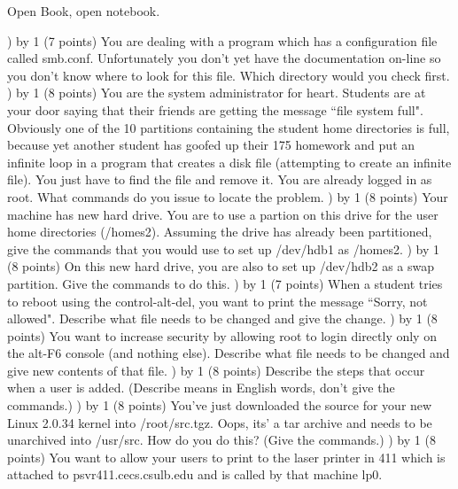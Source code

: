 
\parindent=0in
\nopagenumbers
\newcount\quesno
{}
\def\ques{\number\quesno) \advance\quesno by 1}
\def\aspace{\vskip 1.5in}

Open Book, open notebook.

\ques
(7 points)
You are dealing with a program which has a configuration file
called {\ltt{}smb.conf}.
Unfortunately you don't yet have the documentation on-line so you
don't know where to look for this file.
Which directory would you check first.
\vskip 0.7in
\ques
(8 points)
You are the system administrator for {\ltt{}heart}.
Students are at your door saying that their friends are getting
the message ``file system full".
Obviously one of the 10 partitions containing the student home directories
is full, because yet another student has goofed up their 175 homework and
put an infinite loop in a program that creates a disk file (attempting
to create an infinite file).
You just have to find the file and remove it.
You are already logged in as root. 
What commands do you issue to locate the problem.
\vskip 2in
\ques
(8 points)
Your machine has new hard drive. 
You are to use a partion on this drive for the user home directories
({\ltt{}/homes2}).
Assuming the drive has already been partitioned, give the
commands that you would use to set up {\ltt{}/dev/hdb1} as {\ltt{}/homes2}.
\vskip 2.8in
\ques
(8 points)
On this new hard drive, you are also to set up {\ltt{}/dev/hdb2} as
a swap partition.
Give the commands to do this.
\vfill\eject
\ques
(7 points)
When a student tries to reboot using the control-alt-del, you
want to print the message ``Sorry, not allowed".
Describe what file needs to be changed and give the change.
\vskip 1.5in
\ques
(8 points)
You want to increase security by allowing root to login directly
only on the alt-F6 console (and nothing else).
Describe what file needs to be changed and give new contents of that file.
\vskip 2.0in
\ques
(8 points)
Describe the steps that occur when a user is added. 
(Describe means in English words, don't give the commands.)
\vskip 3.5in
\ques
(8 points)
You've just downloaded the source for your new Linux 2.0.34 kernel
into {\ltt{}/root/src.tgz}.
Oops, its' a tar archive and needs to be unarchived into
{\ltt{}/usr/src}.
How do you do this? (Give the commands.)
\vfill\eject
\ques
(8 points)
You want to allow your users to print to the laser printer in 411
which is attached to {\ltt{}psvr411.cecs.csulb.edu} and is
called by that machine {\ltt{}lp0}.
